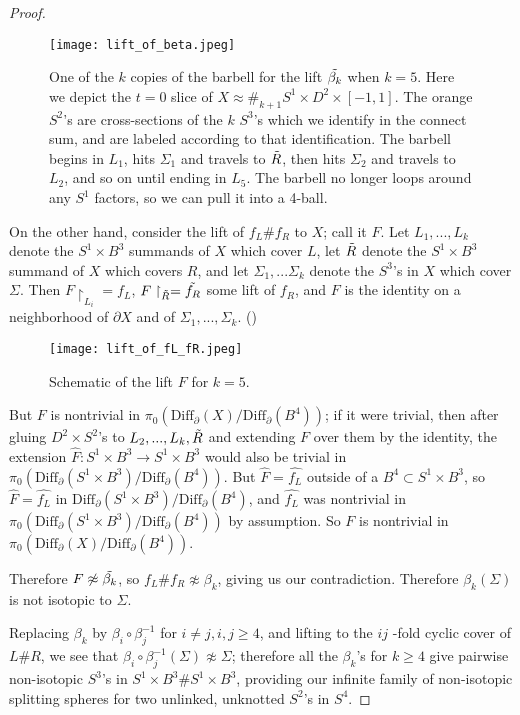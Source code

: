 \documentclass[11pt,letterpaper,twoside]{amsart}
\theoremstyle{definition}
\begin{document}
\begin{proof}
     \begin{figure}[h!]
         \centering
         \texttt{[image: lift\_of\_beta.jpeg]}
         \caption{One of the $k$ copies of the barbell for the lift $\Tilde{\beta_k}$ when $k=5$. Here we depict the $t=0$ slice of $X\approx \#_{k+1} S^1 \times D^2 \times [-1,1]$. The orange $S^2$'s are cross-sections of the $k$ $S^3$'s which we identify in the connect sum, and are labeled according to that identification. The barbell begins in $L_1$, hits $\Sigma_1$ and travels to $\Tilde{R}$, then hits $\Sigma_2$ and travels to $L_2$, and so on until ending in $L_5$.  The barbell no longer loops around any $S^1$ factors, so we can pull it into a 4-ball.}
         \label{beta lift}
     \end{figure}

     \noindent On the other hand, consider the lift of $f_L \# f_R$ to $X$; call it $F$. Let $L_1,...,L_k$ denote the $S^1 \times B^3$ summands of $X$ which cover $L$, let $\Tilde{R}$ denote the $S^1 \times B^3$ summand of $X$ which covers $R$, and let $\Sigma_1,...\Sigma_k$ denote the $S^3$'s in $X$ which cover $\Sigma$. Then $F\restriction_{L_i}=f_L$, $F\restriction_{\Tilde{R}}=\Tilde{f_R}$ some lift of $f_R$, and $F$ is the identity on a neighborhood of $\partial X$ and of $\Sigma_1,...,\Sigma_k$.  ()

     \begin{figure}[h!]
         \centering
         \texttt{[image: lift\_of\_fL\_fR.jpeg]}
         \caption{Schematic of the lift $F$ for $k=5$.}
         \label{lift of fL fR}
     \end{figure}

     \noindent But $F$ is nontrivial in $\pi_0(\text{Diff}_\partial(X)/\text{Diff}_\partial(B^4))$; if it were trivial, then after gluing $D^2 \times S^2$'s to $L_2,...,L_k, \Tilde{R}$ and extending $F$ over them by the identity, the extension $\hat{F}:S^1 \times B^3 \rightarrow S^1 \times B^3$ would also be trivial in $\pi_0(\text{Diff}_\partial(S^1 \times B^3)/\text{Diff}_\partial(B^4))$. But $\hat{F}=\hat{f_L}$ outside of a $B^4 \subset S^1 \times B^3$, so $\hat{F}=\hat{f_L}$ in $\text{Diff}_\partial(S^1 \times B^3)/\text{Diff}_\partial(B^4)$, and $\hat{f_L}$ was nontrivial in $\pi_0(\text{Diff}_\partial(S^1 \times B^3)/\text{Diff}_\partial(B^4))$ by assumption. So $F$ is nontrivial in $\pi_0(\text{Diff}_\partial(X)/\text{Diff}_\partial(B^4))$. 

     \noindent Therefore $F\not\approx \Tilde{\beta_k}$, so $f_L \# f_R \not\approx \beta_k$, giving us our contradiction. Therefore $\beta_k(\Sigma)$ is not isotopic to $\Sigma$.

     \noindent Replacing $\beta_k$ by $\beta_i \circ \beta_j^{-1}$ for $i\neq j, i, j \geq 4$, and lifting to the $ij$ -fold cyclic cover of $L\#R$, we see that $\beta_i \circ \beta_j^{-1}(\Sigma)\not\approx \Sigma$; therefore all the $\beta_k$'s for $k\geq 4$ give pairwise non-isotopic $S^3$'s in $S^1 \times B^3 \# S^1 \times B^3$, providing our infinite family of non-isotopic splitting spheres for two unlinked, unknotted $S^2$'s in $S^4$. 
\end{proof}
\end{document}

